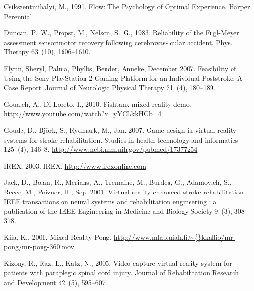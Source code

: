 \documentclass[preprint,authoryear,12pt]{elsarticle}
\begin{document}
\begin{thebibliography}{40}
Csikszentmihalyi, M., 1991. {Flow: The Psychology of Optimal Experience}.
  {Harper Perennial}.

Duncan, P.~W., Propst, M., Nelson, S.~G., 1983. {Reliability of the Fugl-Meyer
  assessment sensorimotor recovery following cerebrovas- cular accident}. Phys.
  Therapy 63~(10), 1606--1610.

{Flynn, Sheryl}, {Palma, Phyllis}, {Bender, Anneke}, {December} 2007.
  {Feasibility of Using the Sony PlayStation 2 Gaming Platform for an
  Individual Poststroke: A Case Report.} {Journal of Neurologic Physical
  Therapy} 31~(4), 180--189.

Gouaich, A., {Di Loreto}, I., 2010. Fishtank mixed reality demo.
\newline\urlprefix\url{http://www.youtube.com/watch?v=yYCLkkHOb\_4}

Goude, D., Bj\"{o}rk, S., Rydmark, M., Jan. 2007. {Game design in virtual
  reality systems for stroke rehabilitation.} Studies in health technology and
  informatics 125~(4), 146--8.
\newline\urlprefix\url{http://www.ncbi.nlm.nih.gov/pubmed/17377254}

IREX, {2003}. {IREX}.
\newline\urlprefix\url{http://www.irexonline.com}

Jack, D., Boian, R., Merians, A., Tremaine, M., Burdea, G., Adamovich, S.,
  Recce, M., Poizner, H., Sep. 2001. {Virtual reality-enhanced stroke
  rehabilitation.} IEEE transactions on neural systems and rehabilitation
  engineering : a publication of the IEEE Engineering in Medicine and Biology
  Society 9~(3), 308--318.

Kiia, K., 2001. {Mixed Reality Pong}.
\newline\urlprefix\url{http://www.mlab.uiah.fi/\~{}kkallio/mr-pong/mr-pong-360.mov}

Kizony, R., Raz, L., Katz, N., 2005. {Video-capture virtual reality system for
  patients with paraplegic spinal cord injury}. Journal of Rehabilitation
  Research and Development 42~(5), 595--607.


\end{thebibliography}
\end{document}
